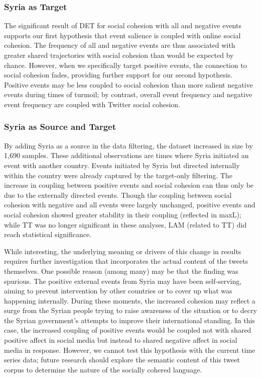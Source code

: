 \documentclass[
  english,
  man]{apa6}
\begin{document}
\hypertarget{syria-as-target-2}{%
\subsubsection{Syria as Target}\label{syria-as-target-2}}

The significant result of DET for social cohesion with all and negative events
supports our first hypothesis that event salience is coupled with online social
cohesion. The frequency of all and negative events are thus associated with
greater shared trajectories with social cohesion than would be expected by
chance. However, when we specifically target positive events, the connection to
social cohesion fades, providing further support for our second hypothesis.
Positive events may be less coupled to social cohesion than more salient
negative events during times of turmoil; by contrast, overall event frequency
and negative event frequency are coupled with Twitter social cohesion.

\hypertarget{syria-as-source-and-target-2}{%
\subsubsection{Syria as Source and Target}\label{syria-as-source-and-target-2}}

By adding Syria as a source in the data filtering, the dataset increased in size
by 1,690 samples. These additional observations are times where Syria initiated
an event with another country. Events initiated by Syria but directed internally
within the country were already captured by the target-only filtering. The
increase in coupling between positive events and social cohesion can thus only
be due to the externally directed events. Though the coupling between social
cohesion with negative and all events were largely unchanged, positive events
and social cohesion showed greater stability in their coupling (reflected in
maxL); while TT was no longer significant in these analyses, LAM (related to TT)
did reach statistical significance.

While interesting, the underlying meaning or drivers of this change in results
requires further investigation that incorporates the actual content of the
tweets themselves. One possible reason (among many) may be that the finding was
spurious. The positive external events from Syria may have been self-serving,
aiming to prevent intervention by other countries or to cover up what was
happening internally. During these moments, the increased cohesion may reflect a
surge from the Syrian people trying to raise awareness of the situation or to
decry the Syrian government's attempts to improve their international standing.
In this case, the increased coupling of positive events would be coupled not
with shared positive affect in social media but instead to shared negative
affect in social media in response. However, we cannot test this hypothesis with
the current time series data; future research should explore the semantic
content of this tweet corpus to determine the nature of the socially cohered
language.
\end{document}
